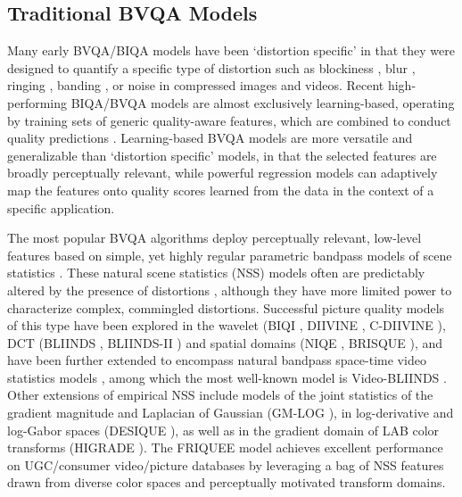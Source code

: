 \documentclass[transmag]{IEEEtran}
\begin{document}
\subsection{Traditional BVQA Models}
\label{ssec:traditiona_bvqa_models}

Many early BVQA/BIQA models have been `distortion specific' in that they were designed to quantify a specific type of distortion such as blockiness \cite{wang2000blind}, blur \cite{marziliano2002no}, ringing \cite{ feng2006measurement}, banding \cite{ wang2016perceptual, tu2020bband, tu2020adaptive}, or noise \cite{amer2005fast, norkin2018film} in compressed images and videos. Recent high-performing BIQA/BVQA models are almost exclusively learning-based, operating by training sets of generic quality-aware features, which are combined to conduct quality predictions \cite{ moorthy2011blind, mittal2012no, saad2014blind, kundu2017no, ghadiyaram2017perceptual, korhonen2019two, ye2012unsupervised, pei2015image}. Learning-based BVQA models are more versatile and generalizable than `distortion specific' models, in that the selected features are broadly perceptually relevant, while powerful regression models can adaptively map the features onto quality scores learned from the data in the context of a specific application.

The most popular BVQA algorithms deploy perceptually relevant, low-level features based on simple, yet highly regular parametric bandpass models of scene statistics \cite{ruderman1994statistics}. These natural scene statistics (NSS) models often are predictably altered by the presence of distortions \cite{sheikh2006image}, although they have more limited power to characterize complex, commingled distortions. Successful picture quality models of this type have been explored in the wavelet (BIQI \cite{moorthy2010two}, DIIVINE \cite{moorthy2011blind}, C-DIIVINE \cite{zhang2014c}), DCT (BLIINDS \cite{saad2010dct}, BLIINDS-II \cite{saad2012blind}) and spatial domains (NIQE \cite{mittal2012making}, BRISQUE \cite{mittal2012no}), and have been further extended to encompass natural bandpass space-time video statistics models \cite{li2016spatiotemporal,mittal2015completely,saad2014blind, sinno2019spatio}, among which the most well-known model is Video-BLIINDS \cite{saad2014blind}. Other extensions of empirical NSS include models of the joint statistics of the gradient magnitude and Laplacian of Gaussian (GM-LOG \cite{xue2014blind}), in log-derivative and log-Gabor spaces (DESIQUE \cite{zhang2013no}), as well as in the gradient domain of LAB color transforms (HIGRADE \cite{kundu2017no}). The FRIQUEE model \cite{ghadiyaram2017perceptual} achieves excellent performance on UGC/consumer video/picture databases  \cite{ghadiyaram2015massive, nuutinen2016cvd2014, hosu2017konstanz, hosu2020koniq, wang2019youtube} by leveraging a bag of NSS features drawn from diverse color spaces and perceptually motivated transform domains.
\end{document}
